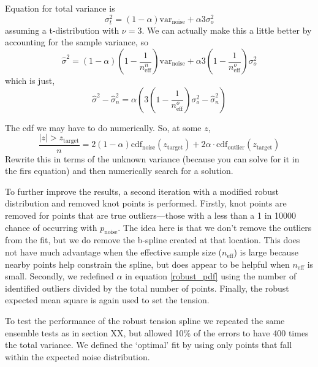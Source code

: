 \documentclass[10pt,journal]{IEEEtran}
\begin{document}
Equation for total variance is
\begin{equation}
    \sigma_t^2 = (1-\alpha) \textrm{var}_\textrm{noise} + \alpha 3 \sigma_o^2
\end{equation}
assuming a t-distribution with $\nu=3$. We can actually make this a little better by accounting for the sample variance, so
\begin{equation}
    \hat{\sigma}^2= (1-\alpha) \left(1-\frac{1}{n^n_\textrm{eff}} \right) \textrm{var}_\textrm{noise} + \alpha 3 \left(1-\frac{1}{n^o_\textrm{eff}} \right) \sigma_o^2
\end{equation}
which is just,
\begin{equation}
    \hat{\sigma}^2 - \hat{\sigma}^2_n = \alpha \left(3 \left(1-\frac{1}{n^o_\textrm{eff}} \right) \sigma_o^2  - \hat{\sigma}^2_n\right)
\end{equation}


The cdf we may have to do numerically. So, at some $z$,
\begin{equation}
    \frac{|z|>z_\textrm{target}}{n} = 2 (1-\alpha) \textrm{cdf}_{\textrm{noise}}(z_\textrm{target}) + 2 \alpha \cdot  \textrm{cdf}_{\textrm{outlier}}(z_\textrm{target})
\end{equation}
Rewrite this in terms of the unknown variance (because you can solve for it in the firs equation) and then numerically search for a solution.


To further improve the results, a second iteration with a modified robust distribution and removed knot points is performed. Firstly, knot points are removed for points that are true outliers---those with a less than a 1 in 10000 chance of occurring with $p_{\textrm{noise}}$. The idea here is that we don't remove the outliers from the fit, but we do remove the b-spline created at that location. This does not have much advantage when the effective sample size ($n_\textrm{eff}$) is large because nearby points help constrain the spline, but does appear to be helpful when $n_\textrm{eff}$ is small. Secondly, we redefined $\alpha$ in equation \ref{robust_pdf} using the number of identified outliers divided by the total number of points. Finally, the robust expected mean square is again used to set the tension.

To test the performance of the robust tension spline we repeated the same ensemble tests as in section XX, but allowed 10\% of the errors to have 400 times the total variance. We defined the `optimal' fit by using only points that fall within the expected noise distribution.  
\end{document}
